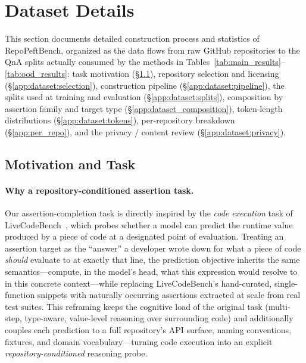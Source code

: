 \documentclass[11pt]{article}
\newcommand{\repopeftbench}{RepoPeftBench\xspace}
\begin{document}
\section{Dataset Details}
\label{app:dataset}
\label{app:dataset_construction}

This section documents detailed construction process and statistics of \repopeftbench{}, organized as the data flows from raw GitHub repositories to the QnA splits actually consumed by the methods in Tables~\ref{tab:main_results}--\ref{tab:ood_results}:
task motivation (\S\ref{app:dataset:motivation}),
repository selection and licensing (\S\ref{app:dataset:selection}),
construction pipeline (\S\ref{app:dataset:pipeline}),
the splits used at training and evaluation (\S\ref{app:dataset:splits}),
composition by assertion family and target type (\S\ref{app:dataset_composition}),
token-length distributions (\S\ref{app:dataset:tokens}),
per-repository breakdown (\S\ref{app:per_repo}),
and the privacy / content review (\S\ref{app:dataset:privacy}).

\subsection{Motivation and Task}
\label{app:dataset:motivation}

\paragraph{Why a repository-conditioned assertion task.}
Our assertion-completion task is directly inspired by the \emph{code execution} task of LiveCodeBench~\cite{jain2025livecodebench}, which probes whether a model can predict the runtime value produced by a piece of code at a designated point of evaluation.
Treating an assertion target as the ``answer'' a developer wrote down for what a piece of code \emph{should} evaluate to at exactly that line, the prediction objective inherits the same semantics---compute, in the model's head, what this expression would resolve to in this concrete context---while replacing LiveCodeBench's hand-curated, single-function snippets with naturally occurring assertions extracted at scale from real test suites.
This reframing keeps the cognitive load of the original task (multi-step, type-aware, value-level reasoning over surrounding code) and additionally couples each prediction to a full repository's API surface, naming conventions, fixtures, and domain vocabulary---turning code execution into an explicit \emph{repository-conditioned} reasoning probe.
\end{document}
